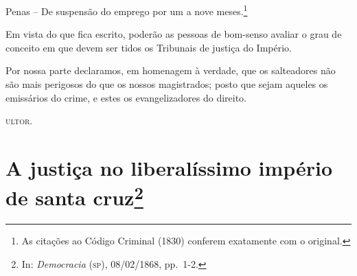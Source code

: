 Penas -- De suspensão do emprego por um a nove meses.\footnote{As
  citações ao Código Criminal (1830) conferem exatamente com o original.}

Em vista do que fica escrito, poderão as pessoas de bom-senso avaliar o
grau de conceito em que devem ser tidos os Tribunais de justiça do
Império.

Por nossa parte declaramos, em homenagem à verdade, que os salteadores
não são mais perigosos do que os nossos magistrados; posto que sejam
aqueles os emissários do crime, e estes os evangelizadores do direito.

\textsc{ultor}.

\chapter{A justiça no liberalíssimo império de santa cruz\footnote{In:
  \emph{Democracia} (\textsc{sp}), 08/02/1868, pp.~1-2.}}

